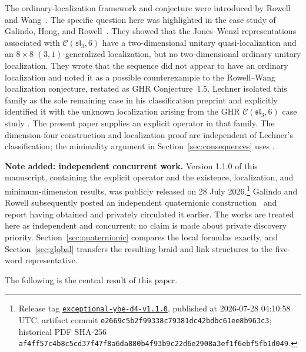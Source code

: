 \documentclass[11pt]{article}
\theoremstyle{remark}
\newcommand{\cC}{\mathcal C}
\begin{document}
The ordinary-localization framework and conjecture were introduced by Rowell
and Wang~\cite{RowellWang2012}.  The specific question here was highlighted
in the case study of Galindo, Hong, and Rowell~\cite[\S5.6]{GHR2013}.  They
showed that the Jones--Wenzl
representations associated with \(\cC(\mathfrak{sl}_3,6)\) have a
two-dimensional unitary quasi-localization and an \(8\times8\)
\((3,1)\)-generalized localization,
but no two-dimensional ordinary unitary localization.  They wrote that the
sequence did not appear to have an ordinary localization and noted it as a
possible counterexample to the Rowell--Wang localization conjecture, restated
as GHR Conjecture~1.5.  Lechner isolated
this family as the sole remaining case in his classification preprint and
explicitly identified it with the unknown localization arising from the GHR
\(\cC(\mathfrak{sl}_3,6)\) case study
\cite[p.~16, discussion following Proposition~3.6]{Lechner2026}.  The present
paper supplies an explicit operator in that family.  The dimension-four
construction and localization proof are independent of Lechner's
classification; the minimality argument in Section~\ref{sec:consequences}
uses \cite[Lemma~3.1 and Theorem~3.4]{Lechner2026}.

\medskip
\noindent\textbf{Note added: independent concurrent work.}
Version 1.1.0 of this manuscript, containing the explicit operator and the
existence, localization, and minimum-dimension results, was publicly released
on 28 July 2026.\footnote{Release tag
\href{https://github.com/AlecKriebel/Math/releases/tag/exceptional-ybe-d4-v1.1.0}
{\texttt{exceptional-ybe-d4-v1.1.0}}, published at 2026-07-28 04:10:58 UTC;
artifact commit
\texttt{e2669c5b2f99\allowbreak338c79381dc4\allowbreak2bdbc61ee8b9\allowbreak63c3};
historical
PDF SHA-256
\texttt{af4ff57c4b8c5cd3\allowbreak7f47f8a6da880b4f\allowbreak93b9c22d6e2908a3\allowbreak{}ef1f6ebf5fb1d049}.}
Galindo and Rowell subsequently posted an independent quaternionic
construction~\cite{GalindoRowell2026} and report having obtained and privately
circulated it earlier.  The works are treated here as independent and
concurrent; no claim is made about private discovery priority.
Section~\ref{sec:quaternionic} compares the local formulas exactly, and
Section~\ref{sec:global} transfers the resulting braid and link structures to
the five-word representative.

The following is the central result of this paper.
\end{document}
